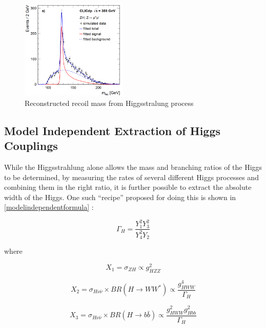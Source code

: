 \begin{figure}
  \centering
  \includegraphics[width=0.45\textwidth,keepaspectratio]{Theory/fig/HiggsRecoilMass.png}
  \caption[Reconstructed recoil mass from Higgsstralung process]{Reconstructed recoil mass from Higgsstralung process}
  \label{fig:higgsstrahlung}
\end{figure}

 
\subsection{Model Independent Extraction of Higgs Couplings}


While the Higgsstrahlung alone allows the mass and branching ratios of the Higgs to be determined, by measuring the rates of several different Higgs processes and combining them in the right ratio, it is further possible to extract the absolute width of the Higgs. One such ``recipe'' proposed for doing this is shown in \ref{modelindependentformula} \cite{Durig:2014lfa}:


\begin{equation}
  \label{modelindependentformula}
  \Gamma_H = \frac{Y_1^2Y_3^2}{Y_4^2Y_2}
\end{equation}

where

\begin{equation}
X_1=\sigma_{ZH} \propto g_{HZZ}^2
\end{equation}

\begin{equation}
  \label{X2}
  X_2=\sigma_{H\nu\bar{\nu}} \times BR(H\rightarrow WW^*) \propto \frac{g_{HWW}^4}{\Gamma_H}
\end{equation}

\begin{equation}
X_3=\sigma_{H\nu\bar{\nu}} \times BR(H\rightarrow b\bar{b}) \propto \frac{g_{HWW}^{2}g_{Hbb}^2}{\Gamma_H}
\end{equation}

